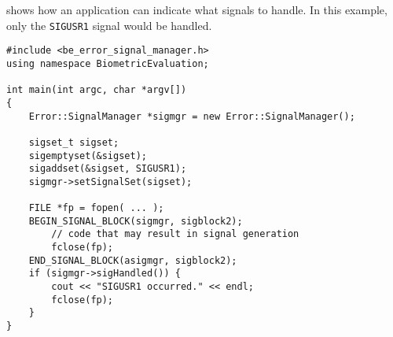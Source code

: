  shows how an application can indicate what
signals to handle. In this example, only the {\tt SIGUSR1} signal would
be handled.

\begin{lstlisting}[caption={Specifying Signals to the SignalManger}, label=signalmanageruse2]
#include <be_error_signal_manager.h>
using namespace BiometricEvaluation;

int main(int argc, char *argv[])
{
    Error::SignalManager *sigmgr = new Error::SignalManager();

    sigset_t sigset;
    sigemptyset(&sigset);
    sigaddset(&sigset, SIGUSR1);
    sigmgr->setSignalSet(sigset);

    FILE *fp = fopen( ... );
    BEGIN_SIGNAL_BLOCK(sigmgr, sigblock2);
        // code that may result in signal generation
        fclose(fp);
    END_SIGNAL_BLOCK(asigmgr, sigblock2);
    if (sigmgr->sigHandled()) {
        cout << "SIGUSR1 occurred." << endl;
        fclose(fp);
    }
}
\end{lstlisting}
